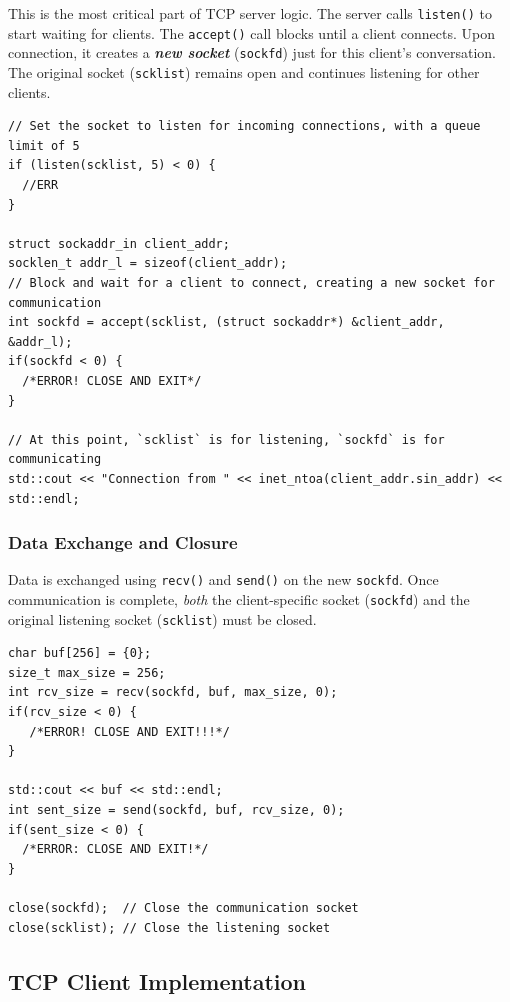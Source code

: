 \documentclass{article}
\begin{document}
This is the most critical part of TCP server logic. The server calls \texttt{listen()} to start waiting for clients. The \texttt{accept()} call blocks until a client connects. Upon connection, it creates a \textit{\textbf{new socket}} (\texttt{sockfd}) just for this client's conversation. The original socket (\texttt{scklist}) remains open and continues listening for other clients.

\begin{verbatim}
// Set the socket to listen for incoming connections, with a queue limit of 5
if (listen(scklist, 5) < 0) {
  //ERR
}

struct sockaddr_in client_addr;
socklen_t addr_l = sizeof(client_addr);
// Block and wait for a client to connect, creating a new socket for communication
int sockfd = accept(scklist, (struct sockaddr*) &client_addr, &addr_l);
if(sockfd < 0) {
  /*ERROR! CLOSE AND EXIT*/
}

// At this point, `scklist` is for listening, `sockfd` is for communicating
std::cout << "Connection from " << inet_ntoa(client_addr.sin_addr) << std::endl;
\end{verbatim}

\subsubsection{Data Exchange and Closure}

Data is exchanged using \texttt{recv()} and \texttt{send()} on the new \texttt{sockfd}. Once communication is complete, \textit{both} the client-specific socket (\texttt{sockfd}) and the original listening socket (\texttt{scklist}) must be closed.

\begin{verbatim}
char buf[256] = {0};
size_t max_size = 256;
int rcv_size = recv(sockfd, buf, max_size, 0);
if(rcv_size < 0) {
   /*ERROR! CLOSE AND EXIT!!!*/
}

std::cout << buf << std::endl;
int sent_size = send(sockfd, buf, rcv_size, 0);
if(sent_size < 0) {
  /*ERROR: CLOSE AND EXIT!*/
}

close(sockfd);  // Close the communication socket
close(scklist); // Close the listening socket
\end{verbatim}

\subsection{TCP Client Implementation}
\end{document}
